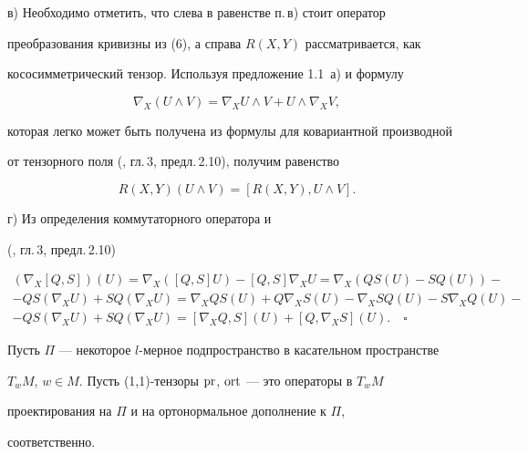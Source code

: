 в) Необходимо отметить, что слева в равенстве п.\,в) стоит оператор


преобразования кривизны из (6), а справа $R(X,Y)$ рассматривается, как


кососимметрический тензор. Используя предложение 1.1~а) и формулу


\begin{equation}


\nabla_X(U\land V)=\nabla_XU\land V+U\land {\nabla_XV},


\end{equation}


которая легко может быть получена из формулы для ковариантной производной


от тензорного поля (\cite{Kob1}, гл.\,3, предл.\,2.10), получим равенство


$$


R(X,Y)(U\land V)=[R(X,Y),U\land V].


$$


г) Из определения коммутаторного оператора и


(\cite{Kob1}, гл.\,3, предл.\,2.10)


\begin{gather*}


(\nabla_X[Q,S])(U)=\nabla_X([Q,S]U)-[Q,S]\nabla_XU=\nabla_X(QS(U)-SQ(U))-\\


-QS(\nabla_XU)+SQ(\nabla_XU)=\nabla_XQS(U)+Q\nabla_XS(U)-\nabla_XSQ(U)-


S\nabla_XQ(U)-\\


-QS(\nabla_XU)+SQ(\nabla_XU)=[\nabla_XQ,S](U)+[Q,\nabla_XS](U).\quad\square


\end{gather*}


\medskip





Пусть $\Pi$ --- некоторое $l$-мерное подпространство в касательном пространстве


$T_wM$, $w\in M$. Пусть (1,1)-тензоры $\operatorname{pr}$, $\operatorname{ort} $ --- это операторы в $T_wM$


проектирования на $\Pi$ и на ортонормальное дополнение к $\Pi$,


соответственно.





